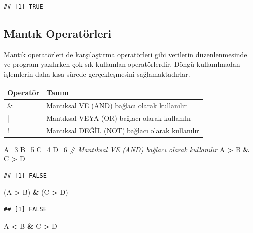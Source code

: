 \documentclass[
]{book}
\newenvironment{Shaded}{\begin{snugshade}}{\end{snugshade}}
\newcommand{\CommentTok}[1]{\textcolor[rgb]{0.56,0.35,0.01}{\textit{#1}}}
\newcommand{\DecValTok}[1]{\textcolor[rgb]{0.00,0.00,0.81}{#1}}
\newcommand{\NormalTok}[1]{#1}
\newcommand{\OtherTok}[1]{\textcolor[rgb]{0.56,0.35,0.01}{#1}}
\newcommand{\SpecialCharTok}[1]{\textcolor[rgb]{0.81,0.36,0.00}{\textbf{#1}}}
\begin{document}
\begin{verbatim}
## [1] TRUE
\end{verbatim}

\subsection{Mantık Operatörleri}\label{mantux131k-operatuxf6rleri}

Mantık operatörleri de karşılaştırma operatörleri gibi verilerin düzenlenmesinde ve program yazılırken çok sık kullanılan operatörlerdir. Döngü kullanılmadan işlemlerin daha kısa sürede gerçekleşmesini sağlamaktadırlar.

\begin{tabular}{ll}
\toprule
Operatör & Tanım\\
\midrule
\& & Mantıksal VE (AND) bağlacı olarak kullanılır\\
| & Mantıksal VEYA (OR) bağlacı olarak kullanılır\\
!= & Mantıksal DEĞİL (NOT) bağlacı olarak kullanılır\\
\bottomrule
\end{tabular}

\begin{Shaded}
\begin{Highlighting}[]
\NormalTok{A}\OtherTok{=}\DecValTok{3}
\NormalTok{B}\OtherTok{=}\DecValTok{5}
\NormalTok{C}\OtherTok{=}\DecValTok{4}
\NormalTok{D}\OtherTok{=}\DecValTok{6}
\CommentTok{\# Mantıksal VE (AND) bağlacı olarak kullanılır}
\NormalTok{A }\SpecialCharTok{\textgreater{}}\NormalTok{ B }\SpecialCharTok{\&}\NormalTok{ C }\SpecialCharTok{\textgreater{}}\NormalTok{ D}
\end{Highlighting}
\end{Shaded}

\begin{verbatim}
## [1] FALSE
\end{verbatim}

\begin{Shaded}
\begin{Highlighting}[]
\NormalTok{(A }\SpecialCharTok{\textgreater{}}\NormalTok{ B) }\SpecialCharTok{\&}\NormalTok{ (C }\SpecialCharTok{\textgreater{}}\NormalTok{ D)}
\end{Highlighting}
\end{Shaded}

\begin{verbatim}
## [1] FALSE
\end{verbatim}

\begin{Shaded}
\begin{Highlighting}[]
\NormalTok{A }\SpecialCharTok{\textless{}}\NormalTok{ B }\SpecialCharTok{\&}\NormalTok{ C }\SpecialCharTok{\textgreater{}}\NormalTok{ D}
\end{Highlighting}
\end{Shaded}
\end{document}
